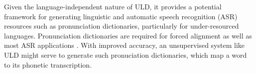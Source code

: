 \documentclass[12pt,letterpaper]{article}
\begin{document}
Given the language-independent nature of ULD, it provides a potential framework for generating linguistic and automatic speech recognition (ASR) resources such as pronunciation dictionaries, particularly for under-resourced languages. Pronunciation dictionaries are required for forced alignment as well as most ASR applications \citep{besacier}. With improved accuracy, an unsupervised system like ULD might serve to generate such pronuciation dictionaries, which map a word to its phonetic transcription. 


\appendix




\newpage 



\end{document}
